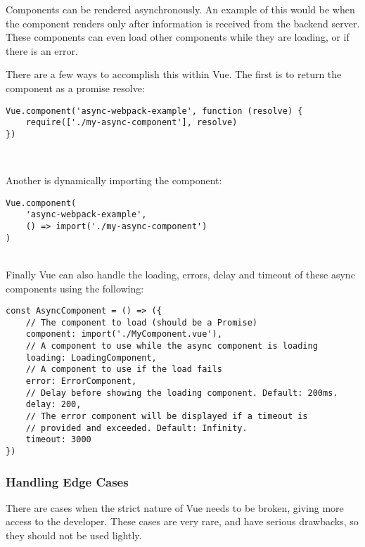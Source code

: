\documentclass[portfolio.tex]{subfiles}
\begin{document}
					Components can be rendered asynchronously. An example of this would be when the component renders only after information is received from the backend server. These components can even load other components while they are loading, or if there is an error.

					There are a few ways to accomplish this within Vue. The first is to return the component as a promise resolve:\\

					\begin{lstlisting}
Vue.component('async-webpack-example', function (resolve) {
	require(['./my-async-component'], resolve)
})
					\end{lstlisting}
					\autocite{vue-async}\\

					\bigbreak

					Another is dynamically importing the component:\\

					\begin{lstlisting}
Vue.component(
	'async-webpack-example',
	() => import('./my-async-component')
)
					\end{lstlisting}
					\autocite{vue-async}\\

					\bigbreak
					Finally Vue can also handle the loading, errors, delay and timeout of these async components using the following:\\

					\begin{lstlisting}
const AsyncComponent = () => ({
	// The component to load (should be a Promise)
	component: import('./MyComponent.vue'),
	// A component to use while the async component is loading
	loading: LoadingComponent,
	// A component to use if the load fails
	error: ErrorComponent,
	// Delay before showing the loading component. Default: 200ms.
	delay: 200,
	// The error component will be displayed if a timeout is
	// provided and exceeded. Default: Infinity.
	timeout: 3000
})
					\end{lstlisting}
					\autocite{vue-async}

				\subsubsection{Handling Edge Cases}
					There are cases when the strict nature of Vue needs to be broken, giving more access to the developer. These cases are very rare, and have serious drawbacks, so they should not be used lightly.\\
\end{document}
